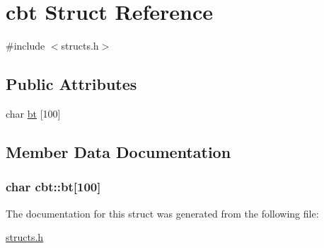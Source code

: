 \hypertarget{structcbt}{\section{cbt Struct Reference}
\label{structcbt}
}


{\ttfamily \#include $<$structs.\-h$>$}

\subsection*{Public Attributes}
\begin{DoxyCompactItemize}
\item 
char \hyperlink{structcbt_acb61cec983ee9409da61c5fbb4c75749}{bt} \mbox{[}100\mbox{]}
\end{DoxyCompactItemize}


\subsection{Member Data Documentation}
\hypertarget{structcbt_acb61cec983ee9409da61c5fbb4c75749}{
\subsubsection[{bt}]{\setlength{\rightskip}{0pt plus 5cm}char cbt\-::bt\mbox{[}100\mbox{]}}}\label{structcbt_acb61cec983ee9409da61c5fbb4c75749}


The documentation for this struct was generated from the following file\-:\begin{DoxyCompactItemize}
\item 
\hyperlink{structs_8h}{structs.\-h}\end{DoxyCompactItemize}
